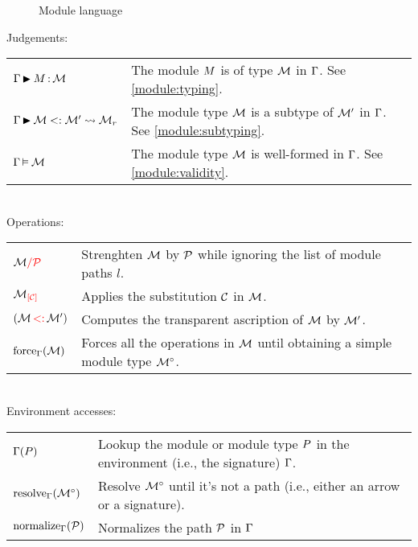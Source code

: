 \documentclass{article}
\theoremstyle{definition}
\begin{document}
\begin{figure}[!hb]
  
  \caption{Module language}
  \label{grammar}
\end{figure}

Judgements:\\
\begin{tabular}{ll}
  $\wtm{\E}{\im}{\iM}$
  &The module $\im$ is of type $\iM$ in $\E$.
  See \cref{module:typing}.\\

  $\submod{\E}{\iM}{\iM'}{\iM_r}$&
  The module type $\iM$ is a subtype of $\iM'$ in $\E$.
  See \cref{module:subtyping}.\\

  $\wfm{\E}{\iM}$ &
  The module type $\iM$ is well-formed in $\E$.
  See \cref{module:validity}.
\end{tabular}\\

Operations:\\
\begin{tabular}{ll}
  $\Ostrengthen{l}{\iP}{\iM}$
  & Strenghten $\iM$ by $\iP$ while ignoring the list of module paths $l$.\\
  $\Oenrich{\iC}{\iM}$
  & Applies the substitution $\iC$ in $\iM$.\\
  $\Otransp{\iM}{\iM'}$
  & Computes the transparent ascription of $\iM$ by $\iM'$.\\
  $\Oforce{\E}{\iM}$
  & Forces all the operations in $\iM$ until obtaining a simple module type $\iMO$.
\end{tabular}\\

Environment accesses:\\
\begin{tabular}{ll}
  $\lookup{\E}{\ip}$
  & Lookup the module or module type $\ip$ in the environment (i.e., the signature)
    $\E$.\\
  $\resolve{\E}{\iMO}$
  & Resolve $\iMO$ until it's not a path (i.e., either an arrow or a signature).\\
  $\Onormalize{\E}{\iP}$
  & Normalizes the path $\iP$ in $\E$
\end{tabular}

\begin{figure}[hbt]
  
\end{figure}


%   
\end{document}
